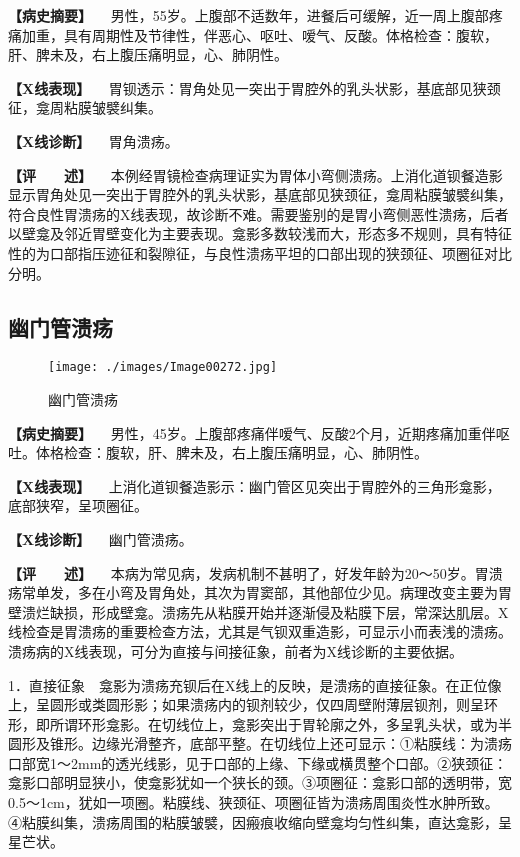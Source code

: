 \textbf{【病史摘要】}
　男性，55岁。上腹部不适数年，进餐后可缓解，近一周上腹部疼痛加重，具有周期性及节律性，伴恶心、呕吐、嗳气、反酸。体格检查：腹软，肝、脾未及，右上腹压痛明显，心、肺阴性。

\textbf{【X线表现】}
　胃钡透示：胃角处见一突出于胃腔外的乳头状影，基底部见狭颈征，龛周粘膜皱襞纠集。

\textbf{【X线诊断】} 　胃角溃疡。

\textbf{【评　　述】}
　本例经胃镜检查病理证实为胃体小弯侧溃疡。上消化道钡餐造影显示胃角处见一突出于胃腔外的乳头状影，基底部见狭颈征，龛周粘膜皱襞纠集，符合良性胃溃疡的X线表现，故诊断不难。需要鉴别的是胃小弯侧恶性溃疡，后者以壁龛及邻近胃壁变化为主要表现。龛影多数较浅而大，形态多不规则，具有特征性的为口部指压迹征和裂隙征，与良性溃疡平坦的口部出现的狭颈征、项圈征对比分明。

\subsection{幽门管溃疡}

\begin{figure}[!htbp]
 \centering
 \texttt{[image: ./images/Image00272.jpg]}
 \captionsetup{justification=centering}
 \caption{幽门管溃疡}
 \label{fig5-3-11}
  \end{figure} 

\textbf{【病史摘要】}
　男性，45岁。上腹部疼痛伴嗳气、反酸2个月，近期疼痛加重伴呕吐。体格检查：腹软，肝、脾未及，右上腹压痛明显，心、肺阴性。

\textbf{【X线表现】}
　上消化道钡餐造影示：幽门管区见突出于胃腔外的三角形龛影，底部狭窄，呈项圈征。

\textbf{【X线诊断】} 　幽门管溃疡。

\textbf{【评　　述】}
　本病为常见病，发病机制不甚明了，好发年龄为20～50岁。胃溃疡常单发，多在小弯及胃角处，其次为胃窦部，其他部位少见。病理改变主要为胃壁溃烂缺损，形成壁龛。溃疡先从粘膜开始并逐渐侵及粘膜下层，常深达肌层。X线检查是胃溃疡的重要检查方法，尤其是气钡双重造影，可显示小而表浅的溃疡。溃疡病的X线表现，可分为直接与间接征象，前者为X线诊断的主要依据。

1．直接征象　龛影为溃疡充钡后在X线上的反映，是溃疡的直接征象。在正位像上，呈圆形或类圆形影；如果溃疡内的钡剂较少，仅四周壁附薄层钡剂，则呈环形，即所谓环形龛影。在切线位上，龛影突出于胃轮廓之外，多呈乳头状，或为半圆形及锥形。边缘光滑整齐，底部平整。在切线位上还可显示：①粘膜线：为溃疡口部宽1～2mm的透光线影，见于口部的上缘、下缘或横贯整个口部。②狭颈征：龛影口部明显狭小，使龛影犹如一个狭长的颈。③项圈征：龛影口部的透明带，宽0.5～1cm，犹如一项圈。粘膜线、狭颈征、项圈征皆为溃疡周围炎性水肿所致。④粘膜纠集，溃疡周围的粘膜皱襞，因瘢痕收缩向壁龛均匀性纠集，直达龛影，呈星芒状。


